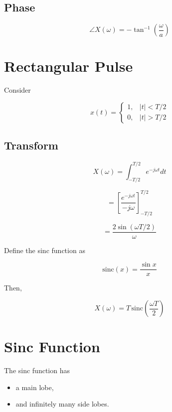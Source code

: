 \subsection{Phase}

\[
\boxed{
\angle X(\omega)=
-\tan^{-1}\left(\frac{\omega}{a}\right)
}
\]


\section{Rectangular Pulse}

Consider

\[
x(t)=
\begin{cases}
1, & |t|<T/2\\
0, & |t|>T/2
\end{cases}
\]


\subsection{Transform}

\[
X(\omega)=
\int_{-T/2}^{T/2}e^{-j\omega t}dt
\]

\[
=
\left[
\frac{e^{-j\omega t}}{-j\omega}
\right]_{-T/2}^{T/2}
\]

\[
=
\frac{2\sin(\omega T/2)}{\omega}
\]

Define the sinc function as

\[
\boxed{
\mathrm{sinc}(x)=\frac{\sin x}{x}
}
\]

Then,

\[
\boxed{
X(\omega)=
T\,\mathrm{sinc}\left(\frac{\omega T}{2}\right)
}
\]


\section{Sinc Function}

The sinc function has

\begin{itemize}
\item a main lobe,
\item and infinitely many side lobes.
\end{itemize}

